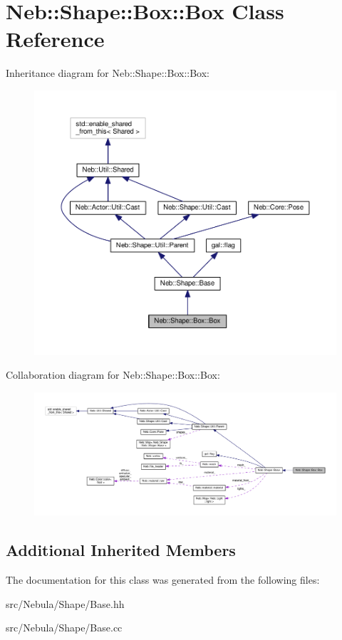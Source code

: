 \hypertarget{classNeb_1_1Shape_1_1Box_1_1Box}{\section{Neb\-:\-:Shape\-:\-:Box\-:\-:Box Class Reference}
\label{classNeb_1_1Shape_1_1Box_1_1Box}
}


Inheritance diagram for Neb\-:\-:Shape\-:\-:Box\-:\-:Box\-:
\nopagebreak
\begin{figure}[H]
\begin{center}
\leavevmode
\includegraphics[width=350pt]{classNeb_1_1Shape_1_1Box_1_1Box__inherit__graph}
\end{center}
\end{figure}


Collaboration diagram for Neb\-:\-:Shape\-:\-:Box\-:\-:Box\-:
\nopagebreak
\begin{figure}[H]
\begin{center}
\leavevmode
\includegraphics[width=350pt]{classNeb_1_1Shape_1_1Box_1_1Box__coll__graph}
\end{center}
\end{figure}
\subsection*{Additional Inherited Members}


The documentation for this class was generated from the following files\-:\begin{DoxyCompactItemize}
\item 
src/\-Nebula/\-Shape/Base.\-hh\item 
src/\-Nebula/\-Shape/Base.\-cc\end{DoxyCompactItemize}

